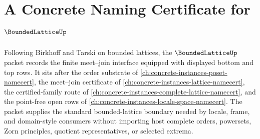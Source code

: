 \chapter{A Concrete Naming Certificate for $\BoundedLatticeUp$}
\label{ch:concrete-instances-bounded-lattice-namecert}

Following Birkhoff and Tarski on bounded lattices, the $\BoundedLatticeUp$ packet records the finite meet--join interface equipped with displayed bottom and top rows. It sits after the order substrate of \autoref{ch:concrete-instances-poset-namecert}, the meet--join certificate of \autoref{ch:concrete-instances-lattice-namecert}, the certified-family route of \autoref{ch:concrete-instances-complete-lattice-namecert}, and the point-free open rows of \autoref{ch:concrete-instances-locale-space-namecert}. The packet supplies the standard bounded-lattice boundary needed by locale, frame, and domain-style consumers without importing host complete orders, powersets, Zorn principles, quotient representatives, or selected extrema.

